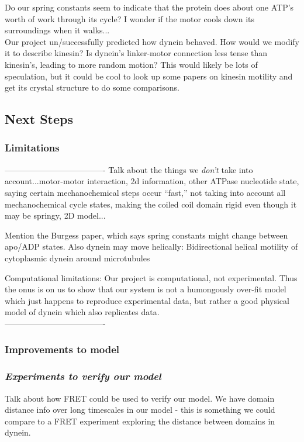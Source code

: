 \documentclass[10pt]{article} %
\begin{document}
Do our spring constants seem to indicate that the protein does about one ATP's worth of work through its cycle? I wonder if the motor cools down its surroundings when it walks...\\

Our project un/successfully predicted how dynein behaved. How would we modify it to describe kinesin? Is dynein's linker-motor connection less tense than kinesin's, leading to more random motion? This would likely be lots of speculation, but it could be cool to look up some papers on kinesin motility and get its crystal structure to do some comparisons.

\subsection{Next Steps}
\subsubsection{Limitations}

-------------------------------------
Talk about the things we \textit{don't} take into account...motor-motor interaction, 2d information, other ATPase nucleotide state, saying certain mechanochemical steps occur ``fast,'' not taking into account all mechanochemical cycle states, making the coiled coil domain rigid even though it may be springy, 2D model...

Mention the Burgess paper, which says spring constants might change between apo/ADP states.
Also dynein may move helically: Bidirectional helical motility of cytoplasmic dynein around microtubules

Computational limitations: Our project is computational, not experimental. Thus the onus is on us to show that our system is not a humongously over-fit model which just happens to reproduce experimental data, but rather a good physical model of dynein which also replicates data.\\
-------------------------------------

\subsubsection{Improvements to model}

\subsubsection{\textit{Experiments to verify our model}}
Talk about how FRET could be used to verify our model. We have domain distance info over long timescales in our model - this is something we could compare to a FRET experiment exploring the distance between domains in dynein.\\
\end{document}
